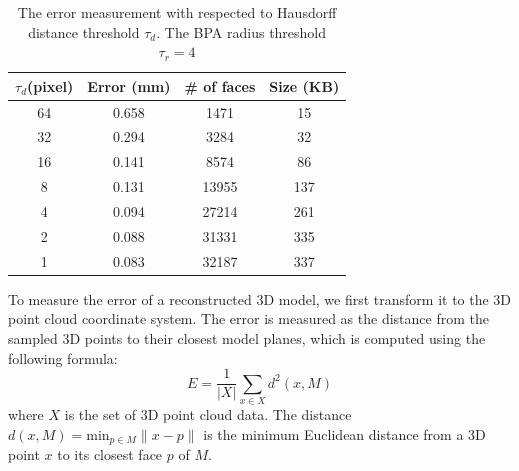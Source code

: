 \documentclass{acmsiggraph}                     %
\begin{document}
\setlength{\tabcolsep}{4pt}
\begin{table}[hbtp]
\begin{center}
\caption{The error measurement with respected to Hausdorff distance threshold $\tau_d$.
The BPA radius threshold $\tau_r = 4$}
\label{tbl_em}
  \begin{tabular}[t]{||c||c|c|c||}
    \hline
    $\tau_{d} $(pixel) & Error (mm)& \# of faces & Size (KB) \\
    \hline \hline
    64 & 0.658 & 1471 & 15\\   %
    \hline		      %
    32 & 0.294 & 3284 & 32\\   %
    \hline		      %
    16 & 0.141 & 8574 & 86\\   %
    \hline		      %
    8 & 0.131 & 13955 & 137\\  %
    \hline		      %
    4 & 0.094 & 27214 & 261\\  %
    \hline		      %
    2 & 0.088 & 31331 & 335\\  %
    \hline
    1 & 0.083 & 32187 & 337\\  %
    \hline
  \end{tabular}
\end{center}
\end{table}
\setlength{\tabcolsep}{1.4pt}
To measure the error of a reconstructed 3D model,
we first transform it to the 3D point cloud coordinate system.
The error is measured as the distance from the sampled 3D points to their closest model planes, which
is computed using the following formula:
\begin{equation}\label{eq_em}
E = \frac{1}{|X|}\sum_{x\in{X}}{d^2(x, M)}
\end{equation}
where $X$ is the set of 3D point cloud data. The distance
$d(x, M) = \text{min}_{p \in M}\lVert x - p \lVert$ is the minimum Euclidean distance from
a 3D point $x$ to its closest face $p$ of $M$.
\end{document}
